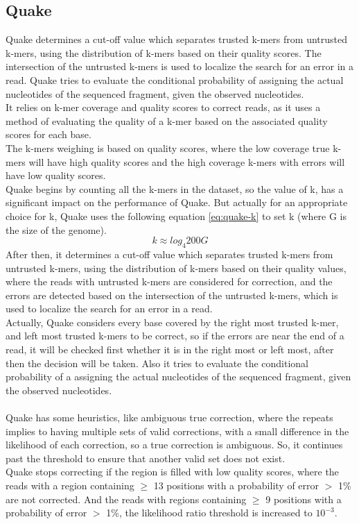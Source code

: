 \documentclass[12pt,openany]{llncs}
\begin{document}
\subsection{Quake}
Quake \cite{Quake} determines a cut-off value which separates trusted k-mers from untrusted k-mers, using the distribution of k-mers based on their quality scores. The intersection of the untrusted k-mers is used to localize the search for an error in a read. Quake tries to evaluate the conditional probability of assigning the actual nucleotides of the sequenced fragment, given the observed nucleotides.
\\
It relies on k-mer coverage and quality scores to correct reads, as it uses a method of evaluating the quality of a k-mer based on the associated quality scores for each base. 
\\
The k-mers weighing is based on quality scores, where the low coverage true k-mers will have high quality scores and the high coverage k-mers with errors will have low quality scores.
\\
Quake begins by counting all the k-mers in the dataset, so the value of k, has a significant impact on the performance of Quake. But actually for an appropriate choice for k, Quake uses the following equation \ref{eq:quake-k} to set k (where G is the size of the genome).
\begin{equation} \label{eq:quake-k}
 k \approx log_{4} 200G  
\end{equation}
After then, it determines a cut-off value which separates trusted k-mers from untrusted k-mers, using the distribution of k-mers based on their quality values, where the reads with untrusted k-mers are considered for correction, and the errors are detected based on the intersection of the untrusted k-mers, which is used to localize the search for an error in a read. 
\\
Actually, Quake considers every base covered by the right most trusted k-mer, and left most trusted k-mers to be correct, so if the errors are near the end of a read, it will be checked first whether it is in the right most or left most, after then the decision will be taken. Also it tries to evaluate the conditional probability of a assigning the actual nucleotides of the sequenced fragment, given the observed nucleotides.
\\
\\
Quake has some heuristics, like ambiguous true correction, where the repeats implies to having multiple sets of valid corrections, with a small difference in the likelihood of each correction, so a true correction is ambiguous. So, it continues past the threshold to ensure that another valid set does not exist. 
\\
Quake stops correcting if the region is filled with low quality scores, where the reads with a region containing $\geq$ 13 positions with a probability of error $>$ 1\% are not corrected. And the reads with regions containing $\geq$ 9 positions with a probability of error $>$ 1\%, the likelihood ratio threshold is increased to $10^{-3}$.
\end{document}
